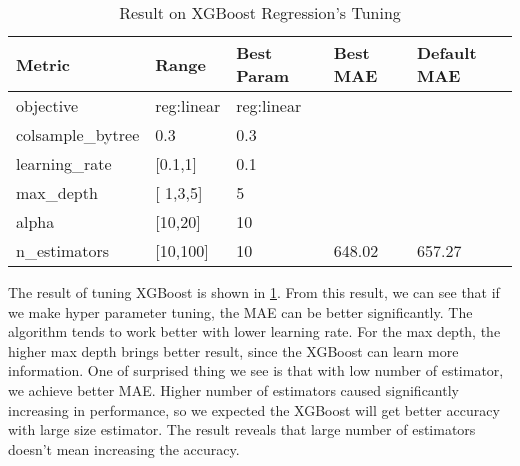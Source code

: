\begin{table}[]
\begin{tabular}{|l|l|l|l|l|}
\hline
{\color[HTML]{000000} \textbf{Metric}}   & {\color[HTML]{000000} \textbf{Range}} & {\color[HTML]{000000} \textbf{Best Param}} & {\color[HTML]{000000} \textbf{Best MAE}}        & {\color[HTML]{000000} \textbf{Default MAE}}     \\ \hline
{\color[HTML]{000000} objective}         & {\color[HTML]{000000} reg:linear}     & {\color[HTML]{000000} reg:linear}          & {\color[HTML]{000000} }                         & {\color[HTML]{000000} }                         \\ \cline{1-3}
{\color[HTML]{000000} colsample\_bytree} & {\color[HTML]{000000} 0.3}            & {\color[HTML]{000000} 0.3}                 & {\color[HTML]{000000} }                         & {\color[HTML]{000000} }                         \\ \cline{1-3}
{\color[HTML]{000000} learning\_rate}    & {\color[HTML]{000000} {[}0.1,1{]}}    & {\color[HTML]{000000} 0.1}                 & {\color[HTML]{000000} }                         & {\color[HTML]{000000} }                         \\ \cline{1-3}
{\color[HTML]{000000} max\_depth}        & {\color[HTML]{000000} {[} 1,3,5{]}}   & {\color[HTML]{000000} 5}                   & {\color[HTML]{000000} }                         & {\color[HTML]{000000} }                         \\ \cline{1-3}
{\color[HTML]{000000} alpha}             & {\color[HTML]{000000} {[}10,20{]}}    & {\color[HTML]{000000} 10}                  & {\color[HTML]{000000} }                         & {\color[HTML]{000000} }                         \\ \cline{1-3}
{\color[HTML]{000000} n\_estimators}     & {\color[HTML]{000000} {[}10,100{]}}   & {\color[HTML]{000000} 10}                  & \multirow{-6}{*}{{\color[HTML]{000000} 648.02}} & \multirow{-6}{*}{{\color[HTML]{000000} 657.27}} \\ \hline
\end{tabular}
\label{tblRQ32}
\caption{Result on XGBoost Regression's Tuning}
\end{table}

The result of tuning XGBoost is shown in \ref{tblRQ32}. From this result, we can see that if we make hyper parameter tuning, the MAE can be better significantly. The algorithm tends to work better with lower learning rate. For the max depth, the higher max depth brings better result, since the XGBoost can learn more information. One of surprised thing we see is that with low number of estimator, we achieve better MAE. Higher number of estimators caused significantly increasing in performance, so we expected the XGBoost will get better accuracy with large size estimator. The result reveals that large number of estimators doesn't mean increasing the accuracy.

